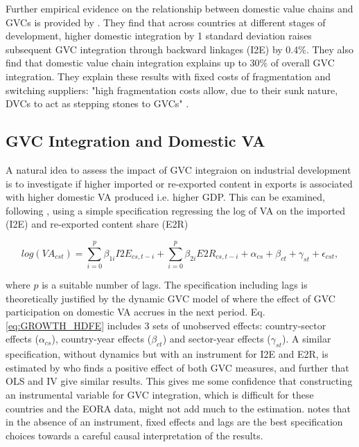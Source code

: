 \documentclass[a4paper]{article}
\begin{document}
Further empirical evidence on the relationship between domestic value chains and GVCs is provided by \citet{beverelli2019domestic}. They find that across countries at different stages of development, higher domestic integration by 1 standard deviation raises subsequent GVC integration through backward linkages (I2E) by 0.4\%. They also find that domestic value chain integration explains up to 30\% of overall GVC integration. They explain these results with fixed costs of fragmentation and switching suppliers: "high fragmentation costs allow, due to their sunk nature, DVCs to act as stepping stones to GVCs" \citep{beverelli2019domestic}. %

\subsection{GVC Integration and Domestic VA}

A natural idea to assess the impact of GVC integraion on industrial development is to investigate if higher imported or re-exported content in exports is associated with higher domestic VA produced i.e. higher GDP. This can be examined, following \citet{kummritz2015global}, using a simple specification regressing the log of VA on the imported (I2E) and re-exported content share (E2R)

\begin{equation} \label{eq:GROWTH_HDFE}
log(VA_{cst}) = \sum_{i=0}^p \beta_{1i} I2E_{cs,t-i} + \sum_{i = 0}^p \beta_{2i} E2R_{cs,t-i}  + \alpha_{cs} + \beta_{ct} +\gamma_{st} + \epsilon_{cst},
\end{equation}

\noindent where $p$ is a suitable number of lags. The specification including lags is theoretically justified by the dynamic GVC model of \citet{LiLiu2015moving} where the effect of GVC participation on domestic VA accrues in the next period. Eq. \ref{eq:GROWTH_HDFE} includes 3 sets of unobserved effects: country-sector effects ($\alpha_{cs}$), country-year effects ($\beta_{ct}$) and sector-year effects ($\gamma_{st}$). A similar specification, without dynamics but with an instrument for I2E and E2R, is estimated by \citet{Kummritz20161} who finds a positive effect of both GVC measures, and further that OLS and IV give similar results. This gives me some confidence that constructing an instrumental variable for GVC integration, which is difficult for these countries and the EORA data, might not add much to the estimation. \citet{kummritz2015global} notes that in the absence of an instrument, fixed effects and lags are the best specification choices towards a careful causal interpretation of the results.  \newline
\end{document}
